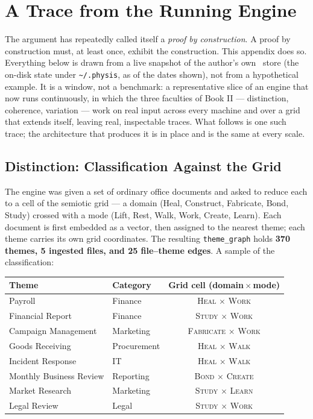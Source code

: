 \chapter{A Trace from the Running Engine}
\label{app:trace}

The argument has repeatedly called itself a \emph{proof by construction}. A proof
by construction must, at least once, exhibit the construction. This appendix does
so. Everything below is drawn from a live snapshot of the author's own \physis\
store (the on-disk state under \texttt{\textasciitilde/.physis}, as of the dates
shown), not from a hypothetical example. It is a window, not a benchmark: a
representative slice of an engine that now runs continuously, in which the three
faculties of Book II --- distinction, coherence, variation --- work on real input
across every machine and over a grid that extends itself, leaving real, inspectable
traces. What follows is one such trace; the architecture that produces it is in
place and is the same at every scale.

\section{Distinction: Classification Against the Grid}

The engine was given a set of ordinary office documents and asked to reduce each
to a cell of the semiotic grid --- a domain (Heal, Construct, Fabricate, Bond,
Study) crossed with a mode (Lift, Rest, Walk, Work, Create, Learn). Each document
is first embedded as a vector, then assigned to the nearest theme;
each theme carries its own grid coordinates. The resulting \texttt{theme\_graph}
holds \textbf{370 themes, 5 ingested files, and 25 file--theme edges}. A sample of
the classification:

\begin{center}
\begin{tabular}{@{}llc@{}}
\toprule
Theme & Category & Grid cell (domain\,$\times$\,mode) \\
\midrule
Payroll                 & Finance     & \textsc{Heal} $\times$ \textsc{Work} \\
Financial Report        & Finance     & \textsc{Study} $\times$ \textsc{Work} \\
Campaign Management     & Marketing   & \textsc{Fabricate} $\times$ \textsc{Work} \\
Goods Receiving         & Procurement & \textsc{Heal} $\times$ \textsc{Walk} \\
Incident Response       & IT          & \textsc{Heal} $\times$ \textsc{Walk} \\
Monthly Business Review & Reporting   & \textsc{Bond} $\times$ \textsc{Create} \\
Market Research         & Marketing   & \textsc{Study} $\times$ \textsc{Learn} \\
Legal Review            & Legal       & \textsc{Study} $\times$ \textsc{Work} \\
\bottomrule
\end{tabular}
\end{center}

